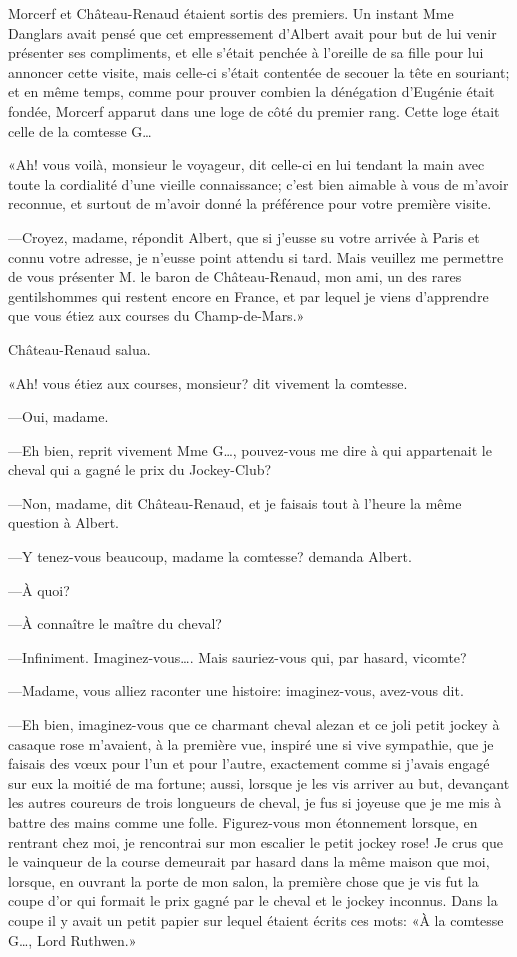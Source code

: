 Morcerf et Château-Renaud étaient sortis des premiers. Un instant Mme Danglars avait pensé que cet empressement d'Albert avait pour but de lui venir présenter ses compliments, et elle s'était penchée à l'oreille de sa fille pour lui annoncer cette visite, mais celle-ci s'était contentée de secouer la tête en souriant; et en même temps, comme pour prouver combien la dénégation d'Eugénie était fondée, Morcerf apparut dans une loge de côté du premier rang. Cette loge était celle de la comtesse G\dots 

«Ah! vous voilà, monsieur le voyageur, dit celle-ci en lui tendant la main avec toute la cordialité d'une vieille connaissance; c'est bien aimable à vous de m'avoir reconnue, et surtout de m'avoir donné la préférence pour votre première visite. 

—Croyez, madame, répondit Albert, que si j'eusse su votre arrivée à Paris et connu votre adresse, je n'eusse point attendu si tard. Mais veuillez me permettre de vous présenter M. le baron de Château-Renaud, mon ami, un des rares gentilshommes qui restent encore en France, et par lequel je viens d'apprendre que vous étiez aux courses du Champ-de-Mars.» 

Château-Renaud salua. 

«Ah! vous étiez aux courses, monsieur? dit vivement la comtesse. 

—Oui, madame. 

—Eh bien, reprit vivement Mme G\dots, pouvez-vous me dire à qui appartenait le cheval qui a gagné le prix du Jockey-Club? 

—Non, madame, dit Château-Renaud, et je faisais tout à l'heure la même question à Albert. 

—Y tenez-vous beaucoup, madame la comtesse? demanda Albert. 

—À quoi? 

—À connaître le maître du cheval? 

—Infiniment. Imaginez-vous\dots. Mais sauriez-vous qui, par hasard, vicomte? 

—Madame, vous alliez raconter une histoire: imaginez-vous, avez-vous dit. 

—Eh bien, imaginez-vous que ce charmant cheval alezan et ce joli petit jockey à casaque rose m'avaient, à la première vue, inspiré une si vive sympathie, que je faisais des vœux pour l'un et pour l'autre, exactement comme si j'avais engagé sur eux la moitié de ma fortune; aussi, lorsque je les vis arriver au but, devançant les autres coureurs de trois longueurs de cheval, je fus si joyeuse que je me mis à battre des mains comme une folle. Figurez-vous mon étonnement lorsque, en rentrant chez moi, je rencontrai sur mon escalier le petit jockey rose! Je crus que le vainqueur de la course demeurait par hasard dans la même maison que moi, lorsque, en ouvrant la porte de mon salon, la première chose que je vis fut la coupe d'or qui formait le prix gagné par le cheval et le jockey inconnus. Dans la coupe il y avait un petit papier sur lequel étaient écrits ces mots: «À la comtesse G\dots, Lord Ruthwen.» 

